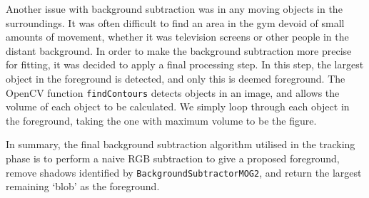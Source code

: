 Another issue with background subtraction was in any moving objects in the surroundings. It was often difficult to find an area in the gym devoid of small amounts of movement, whether it was television screens or other people in the distant background. In order to make the background subtraction more precise for fitting, it was decided to apply a final processing step. In this step, the largest object in the foreground is detected, and only this is deemed foreground. The OpenCV function \verb!findContours! detects objects in an image, and allows the volume of each object to be calculated. We simply loop through each object in the foreground, taking the one with maximum volume to be the figure.

In summary, the final background subtraction algorithm utilised in the tracking phase is to perform a naive RGB subtraction to give a proposed foreground, remove shadows identified by \verb!BackgroundSubtractorMOG2!, and return the largest remaining `blob' as the foreground.